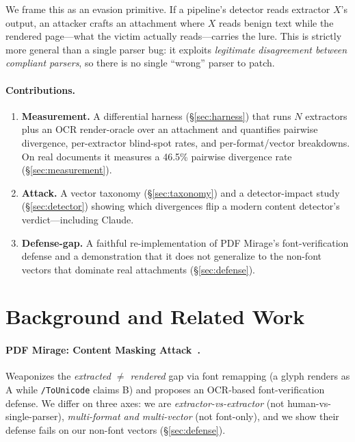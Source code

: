 \documentclass[11pt]{article}
\newcommand{\code}[1]{\texttt{#1}}
\begin{document}
We frame this as an evasion primitive. If a pipeline's detector reads extractor
$X$'s output, an attacker crafts an attachment where $X$ reads benign text while
the rendered page---what the victim actually reads---carries the lure. This is
strictly more general than a single parser bug: it exploits \emph{legitimate
disagreement between compliant parsers}, so there is no single ``wrong'' parser
to patch.

\paragraph{Contributions.}
\begin{enumerate}
  \item \textbf{Measurement.} A differential harness (\S\ref{sec:harness}) that
  runs $N$ extractors plus an OCR render-oracle over an attachment and
  quantifies pairwise divergence, per-extractor blind-spot rates, and
  per-format/vector breakdowns. On real documents it measures a 46.5\% pairwise
  divergence rate (\S\ref{sec:measurement}).
  \item \textbf{Attack.} A vector taxonomy (\S\ref{sec:taxonomy}) and a
  detector-impact study (\S\ref{sec:detector}) showing which divergences flip a
  modern content detector's verdict---including Claude.
  \item \textbf{Defense-gap.} A faithful re-implementation of PDF Mirage's
  font-verification defense and a demonstration that it does not generalize to
  the non-font vectors that dominate real attachments (\S\ref{sec:defense}).
\end{enumerate}

\section{Background and Related Work}

\paragraph{PDF Mirage: Content Masking Attack~\cite{pdfmirage}.} Weaponizes the
\emph{extracted $\neq$ rendered} gap via font remapping (a glyph renders as A
while \code{/ToUnicode} claims B) and proposes an OCR-based font-verification
defense. We differ on three axes: we are \emph{extractor-vs-extractor} (not
human-vs-single-parser), \emph{multi-format and multi-vector} (not font-only),
and we show their defense fails on our non-font vectors (\S\ref{sec:defense}).
\end{document}
